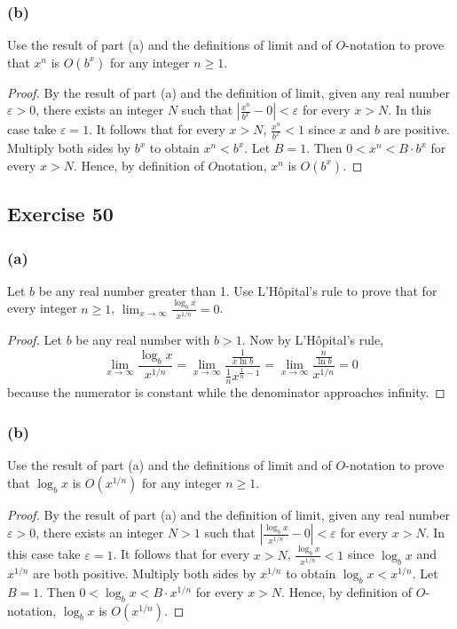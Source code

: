 \documentclass[14pt]{extarticle}
\newcommand{\dps}{\displaystyle}
\newcommand{\eps}{\varepsilon}
\begin{document}
\subsubsection{(b)}
Use the result of part (a) and the definitions of limit and of \(O\)-notation to prove that \(x^n\) is \(O(b^x)\) for any 
integer \(n \geq 1\).

\begin{proof}
By the result of part (a) and the definition of limit, given any real number \(\eps > 0\), there exists an integer \(N\) 
such that \(\dps \left|\frac{x^n}{b^x} - 0\right| < \eps\) for every \(x > N\). In this case take \(\eps = 1\). It follows 
that for every \(x > N\), \(\dps \frac{x^n}{b^x} < 1\) since \(x\) and \(b\) are positive. Multiply both sides by \(b^x\) to 
obtain \(x^n < b^x\). Let \(B = 1\). Then \(0 < x^n < B \cdot b^x\) for every \(x > N\). 
Hence, by definition of \(O\)notation, \(x^n\) is \(O(b^x)\).
\end{proof}

\subsection{Exercise 50}
\subsubsection{(a)}
Let \(b\) be any real number greater than 1. Use L’Hôpital’s rule to prove that for every integer \(n \geq 1\), 
\(\dps \lim_{x \to \infty}\frac{\log_b x}{x^{1/n}} = 0\).

\begin{proof}
Let \(b\) be any real number with \(b > 1\). Now by L’Hôpital’s rule, 
\[
\lim_{x \to \infty} \frac{\log_b x}{x^{1/n}} = \lim_{x \to \infty} \frac{\frac{1}{x \ln b}}{\frac{1}{n}x^{\frac{1}{n}-1}} 
= \lim_{x \to \infty} \frac{\frac{n}{\ln b}}{x^{1/n}} = 0
\]
because the numerator is constant while the denominator approaches infinity.
\end{proof}

\subsubsection{(b)}
Use the result of part (a) and the definitions of limit and of \(O\)-notation to prove that \(\log_b x\) is \(O(x^{1/n})\) 
for any integer \(n \geq 1\).

\begin{proof}
By the result of part (a) and the definition of limit, given any real number \(\eps > 0\), there exists an integer \(N>1\) 
such that \(\dps \left|\frac{\log_b x}{x^{1/n}} - 0\right| < \eps\) for every \(x > N\). In this case take \(\eps = 1\). It 
follows that for every \(x > N\), \(\dps \frac{\log_b x}{x^{1/n}} < 1\) since \(\log_b x\) and \(x^{1/n}\) are both 
positive. Multiply both sides by \(x^{1/n}\) to obtain \(\log_b x < x^{1/n}\). Let \(B = 1\). Then \(0 < \log_b x < B 
\cdot x^{1/n}\) for every \(x > N\). Hence, by definition of \(O\)-notation, \(\log_b x\) is \(O(x^{1/n})\).
\end{proof}
\end{document}
